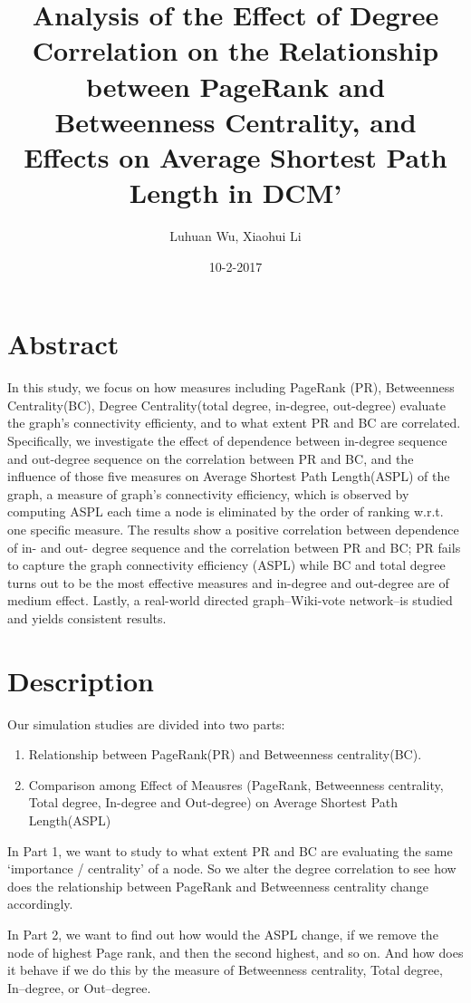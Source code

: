 \documentclass{article}
\title{Analysis of the Effect of Degree Correlation on the Relationship between PageRank and Betweenness Centrality, and Effects on Average Shortest Path Length in DCM'}
\author{\vspace{-6ex} Luhuan Wu, Xiaohui Li}
\date{10-2-2017}
\begin{document}
\maketitle

\section{Abstract}
\par In this study, we focus on how measures including PageRank (PR), Betweenness Centrality(BC), Degree Centrality(total degree, in-degree, out-degree) evaluate the graph's connectivity efficienty, and to what extent PR and BC are correlated. Specifically, we investigate the effect of dependence between in-degree sequence and out-degree sequence on the correlation between PR and BC, and the influence of those five measures on Average Shortest Path Length(ASPL) of the graph, a measure of graph's connectivity efficiency, which is observed by computing ASPL each time a node is eliminated by the order of ranking w.r.t. one specific measure. The results show a positive correlation between dependence of in- and out- degree sequence and the correlation between PR and BC; PR fails to capture the graph connectivity efficiency (ASPL) while BC and total degree turns out to be the most effective measures and in-degree and out-degree are of medium effect. Lastly, a real-world directed graph--Wiki-vote network--is studied and yields consistent results.

\section{Description}
Our simulation studies are divided into two parts:
\begin{enumerate}
\item Relationship between PageRank(PR) and Betweenness centrality(BC).
\item Comparison among Effect of Meausres (PageRank, Betweenness centrality, Total degree, In-degree and Out-degree) on Average Shortest Path Length(ASPL)
\end{enumerate}
\par In Part 1, we want to study to what extent PR and BC are evaluating the same `importance / centrality' of a node. So we alter the degree correlation to see how does the relationship between PageRank and Betweenness centrality change accordingly.
\par In Part 2, we want to find out how would the ASPL change, if we remove the node of highest Page rank, and then the second highest, and so on. And how does it behave if we do this by the measure of Betweenness centrality,  Total degree,  In--degree, or Out--degree.  \\
\end{document}
